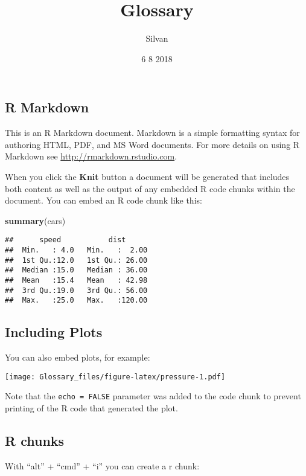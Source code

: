 \documentclass[]{article}
\title{Glossary}
\author{Silvan}
\date{6 8 2018}
\newenvironment{Shaded}{\begin{snugshade}}{\end{snugshade}}
\newcommand{\KeywordTok}[1]{\textcolor[rgb]{0.13,0.29,0.53}{\textbf{#1}}}
\newcommand{\NormalTok}[1]{#1}
\begin{document}
\maketitle

\subsection{R Markdown}\label{r-markdown}

This is an R Markdown document. Markdown is a simple formatting syntax
for authoring HTML, PDF, and MS Word documents. For more details on
using R Markdown see \url{http://rmarkdown.rstudio.com}.

When you click the \textbf{Knit} button a document will be generated
that includes both content as well as the output of any embedded R code
chunks within the document. You can embed an R code chunk like this:

\begin{Shaded}
\begin{Highlighting}[]
\KeywordTok{summary}\NormalTok{(cars)}
\end{Highlighting}
\end{Shaded}

\begin{verbatim}
##      speed           dist       
##  Min.   : 4.0   Min.   :  2.00  
##  1st Qu.:12.0   1st Qu.: 26.00  
##  Median :15.0   Median : 36.00  
##  Mean   :15.4   Mean   : 42.98  
##  3rd Qu.:19.0   3rd Qu.: 56.00  
##  Max.   :25.0   Max.   :120.00
\end{verbatim}

\subsection{Including Plots}\label{including-plots}

You can also embed plots, for example:

\texttt{[image: Glossary\_files/figure-latex/pressure-1.pdf]}

Note that the \texttt{echo\ =\ FALSE} parameter was added to the code
chunk to prevent printing of the R code that generated the plot.

\subsection{R chunks}\label{r-chunks}

With ``alt'' + ``cmd'' + ``i'' you can create a r chunk:
\end{document}
